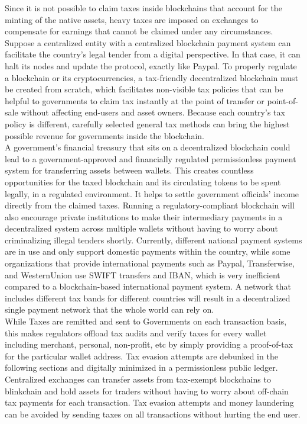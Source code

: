 \documentclass[letterpaper,11pt]{article}
\begin{document}
Since it is not possible to claim taxes inside blockchains that account for the minting of the native assets, heavy taxes are imposed on exchanges to compensate for earnings that cannot be claimed under any circumstances. Suppose a centralized entity with a centralized blockchain payment system can facilitate the country's legal tender from a digital perspective. In that case, it can halt its nodes and update the protocol, exactly like Paypal. To properly regulate a blockchain or its cryptocurrencies, a tax-friendly decentralized blockchain must be created from scratch, which facilitates non-visible tax policies that can be helpful to governments to claim tax instantly at the point of transfer or point-of-sale without affecting end-users and asset owners. Because each country's tax policy is different, carefully selected general tax methods can bring the highest possible revenue for governments inside the blockchain.\\

A government's financial treasury that sits on a decentralized blockchain could lead to a government-approved and financially regulated permissionless payment system for transferring assets between wallets. This creates countless opportunities for the taxed blockchain and its circulating tokens to be spent legally, in a regulated environment. It helps to settle government officials' income directly from the claimed taxes. Running a regulatory-compliant blockchain will also encourage private institutions to make their intermediary payments in a decentralized system across multiple wallets without having to worry about criminalizing illegal tenders shortly. Currently, different national payment systems are in use and only support domestic payments within the country, while some organizations that provide international payments such as Paypal, Transferwise, and WesternUnion use SWIFT transfers and IBAN, which is very inefficient compared to a blockchain-based international payment system. A network that includes different tax bands for different countries will result in a decentralized single payment network that the whole world can rely on.\\

While Taxes are remitted and sent to Governments on each transaction basis, this makes regulators offload tax audits and verify taxes for every wallet including merchant, personal, non-profit, etc by simply providing a proof-of-tax for the particular wallet address. Tax evasion attempts are debunked in the following sections and digitally minimized in a permissionless public ledger. Centralized exchanges can transfer assets from tax-exempt blockchains to blinkchain and hold assets for traders without having to worry about off-chain tax payments for each transaction. Tax evasion attempts and money laundering can be avoided by sending taxes on all transactions without hurting the end user.
\end{document}
